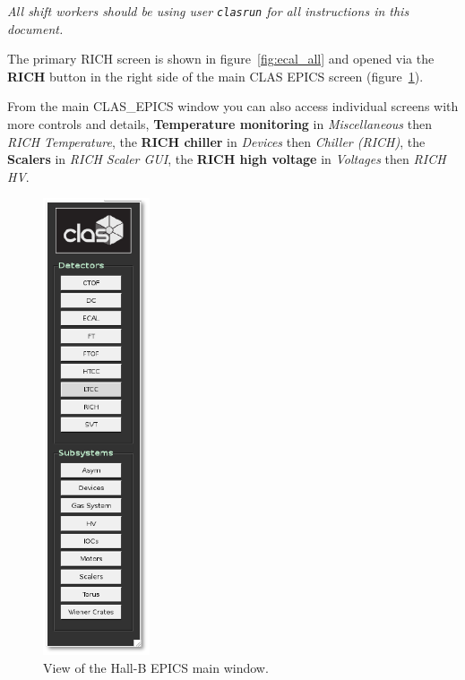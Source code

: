 \documentclass[12pt]{article}
\begin{document}
{\em   All shift workers should be using user \texttt{clasrun} for all instructions in this document.}

The primary RICH screen is shown in figure~\ref{fig:ecal_all} and opened via the {\bf RICH} button in the right side of the main CLAS EPICS screen (figure~\ref{EPICSmain}).

From the main CLAS\_EPICS window you can also access individual screens with more controls and details, {\bf Temperature monitoring} in {\it Miscellaneous} then {\it RICH Temperature}, the {\bf RICH chiller} in {\it Devices} then {\it Chiller (RICH)}, the {\bf Scalers} in {\it RICH Scaler GUI}, the {\bf RICH high voltage} in {\it Voltages} then {\it RICH HV}.


\begin{figure}[h!]
\center
\includegraphics[width=0.28\textwidth]{pics/CLAS_EPICS.pdf}
\caption{ \label{EPICSmain} View of the Hall-B EPICS main window.}
\end{figure}
\end{document}
